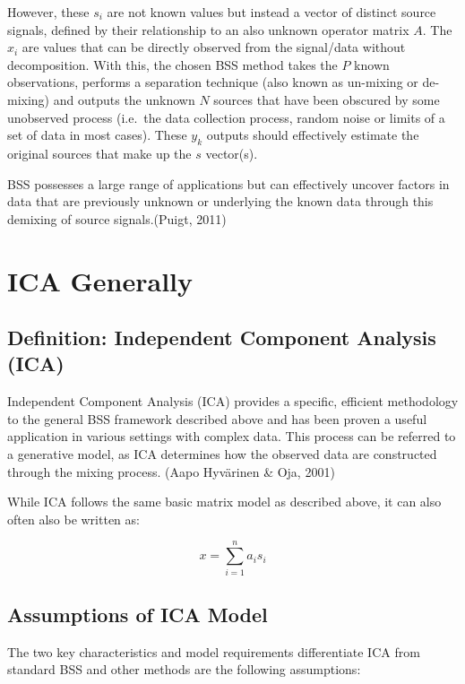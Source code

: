 \documentclass[12pt,twoside]{amherstthesis}
\begin{document}
  However, these \(s_i\) are not known values but instead a vector of
  distinct source signals, defined by their relationship to an also
  unknown operator matrix \(A\). The \(x_i\) are values that can be
  directly observed from the signal/data without decomposition. With this,
  the chosen BSS method takes the \(P\) known observations, performs a
  separation technique (also known as un-mixing or de-mixing) and outputs
  the unknown \(N\) sources that have been obscured by some unobserved
  process (i.e.~the data collection process, random noise or limits of a
  set of data in most cases). These \(y_k\) outputs should effectively
  estimate the original sources that make up the \(s\) vector(s).
  
  BSS possesses a large range of applications but can effectively uncover
  factors in data that are previously unknown or underlying the known data
  through this demixing of source signals.(Puigt, 2011)
  
  \section{ICA Generally}\label{ica-generally}
  
  \subsection{Definition: Independent Component Analysis
  (ICA)}\label{definition-independent-component-analysis-ica}
  
  Independent Component Analysis (ICA) provides a specific, efficient
  methodology to the general BSS framework described above and has been
  proven a useful application in various settings with complex data. This
  process can be referred to a generative model, as ICA determines how the
  observed data are constructed through the mixing process. (Aapo
  Hyvärinen \& Oja, 2001)
  
  While ICA follows the same basic matrix model as described above, it can
  also often also be written as:
  
  \[x = \sum_{i=1}^n a_is_i\]
  
  \subsection{Assumptions of ICA Model}\label{assumptions-of-ica-model}
  
  The two key characteristics and model requirements differentiate ICA
  from standard BSS and other methods are the following assumptions:
  
\end{document}
